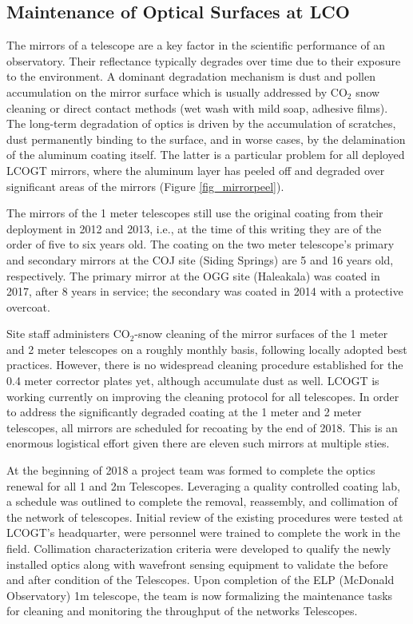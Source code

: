 \documentclass[]{spieman}
\begin{document}
\subsection{Maintenance of Optical Surfaces at LCO}


The mirrors of a telescope are a key factor in the  scientific performance of an observatory. Their
reflectance typically degrades over time due to their exposure to the environment. A dominant
degradation mechanism is dust and pollen accumulation on the mirror surface which is usually
addressed by CO$_2$ snow cleaning or direct contact methods (wet wash with mild soap, adhesive
films). The long-term degradation of optics is driven by the accumulation of scratches, dust
permanently binding to the surface, and in worse cases, by the delamination of the aluminum coating
itself. The latter is a particular problem for all deployed LCOGT mirrors, where the aluminum layer
has peeled off and degraded over significant areas of the mirrors (Figure \ref{fig_mirrorpeel}).

The mirrors of the 1 meter telescopes still use the original coating from their deployment in 2012
and 2013, i.e., at the time of this writing they are of the order of five to six years old. The
coating  on the two meter telescope's  primary and secondary mirrors at the COJ site (Siding
Springs) are 5  and 16 years old, respectively. The primary  mirror at the OGG site (Haleakala) was
coated in 2017, after 8 years in service; the secondary  was coated in 2014 with a protective
overcoat.

Site staff administers CO$_2$-snow cleaning of the mirror surfaces of the 1 meter and 2 meter
telescopes on a roughly monthly basis, following locally adopted best practices. However, there is
no widespread cleaning procedure established for the 0.4 meter corrector plates yet, although
accumulate dust as well. LCOGT is working currently on improving the cleaning protocol for all
telescopes. In order to address the significantly degraded coating at the 1 meter and 2 meter
telescopes, all mirrors are scheduled for recoating by the end of 2018. This is an enormous
logistical effort given there are eleven such mirrors at multiple sties.

At the beginning of 2018 a project team was formed to complete the optics renewal for all 1 and
2m Telescopes.  Leveraging a quality controlled coating lab, a schedule was outlined to complete
the removal, reassembly, and collimation of the network of telescopes.  Initial review of the
existing procedures were tested at LCOGT's headquarter, were personnel were trained to complete the
work in the field.  Collimation characterization criteria were developed to qualify the newly
installed optics along with wavefront sensing equipment to validate the before and after condition
of the Telescopes.  Upon completion of the ELP (McDonald Observatory) 1m telescope, the team is now
formalizing the maintenance tasks for cleaning and monitoring the throughput of the networks 
Telescopes.
\end{document}
